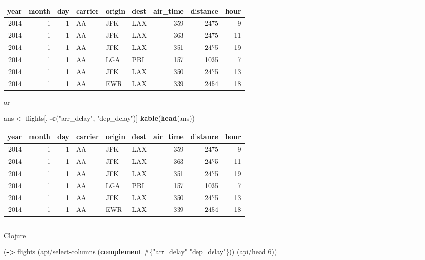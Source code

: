 \documentclass[]{article}
\newenvironment{Shaded}{\begin{snugshade}}{\end{snugshade}}
\newcommand{\DecValTok}[1]{\textcolor[rgb]{0.00,0.00,0.81}{#1}}
\newcommand{\KeywordTok}[1]{\textcolor[rgb]{0.13,0.29,0.53}{\textbf{#1}}}
\newcommand{\NormalTok}[1]{#1}
\newcommand{\OperatorTok}[1]{\textcolor[rgb]{0.81,0.36,0.00}{\textbf{#1}}}
\newcommand{\StringTok}[1]{\textcolor[rgb]{0.31,0.60,0.02}{#1}}
\begin{document}
\begin{longtable}[]{@{}rrrlllrrr@{}}
\toprule
year & month & day & carrier & origin & dest & air\_time & distance &
hour\tabularnewline
\midrule
\endhead
2014 & 1 & 1 & AA & JFK & LAX & 359 & 2475 & 9\tabularnewline
2014 & 1 & 1 & AA & JFK & LAX & 363 & 2475 & 11\tabularnewline
2014 & 1 & 1 & AA & JFK & LAX & 351 & 2475 & 19\tabularnewline
2014 & 1 & 1 & AA & LGA & PBI & 157 & 1035 & 7\tabularnewline
2014 & 1 & 1 & AA & JFK & LAX & 350 & 2475 & 13\tabularnewline
2014 & 1 & 1 & AA & EWR & LAX & 339 & 2454 & 18\tabularnewline
\bottomrule
\end{longtable}

or

\begin{Shaded}
\begin{Highlighting}[]
\NormalTok{ans <-}\StringTok{ }\NormalTok{flights[, }\OperatorTok{-}\KeywordTok{c}\NormalTok{(}\StringTok{"arr_delay"}\NormalTok{, }\StringTok{"dep_delay"}\NormalTok{)]}
\KeywordTok{kable}\NormalTok{(}\KeywordTok{head}\NormalTok{(ans))}
\end{Highlighting}
\end{Shaded}

\begin{longtable}[]{@{}rrrlllrrr@{}}
\toprule
year & month & day & carrier & origin & dest & air\_time & distance &
hour\tabularnewline
\midrule
\endhead
2014 & 1 & 1 & AA & JFK & LAX & 359 & 2475 & 9\tabularnewline
2014 & 1 & 1 & AA & JFK & LAX & 363 & 2475 & 11\tabularnewline
2014 & 1 & 1 & AA & JFK & LAX & 351 & 2475 & 19\tabularnewline
2014 & 1 & 1 & AA & LGA & PBI & 157 & 1035 & 7\tabularnewline
2014 & 1 & 1 & AA & JFK & LAX & 350 & 2475 & 13\tabularnewline
2014 & 1 & 1 & AA & EWR & LAX & 339 & 2454 & 18\tabularnewline
\bottomrule
\end{longtable}

\begin{center}\rule{0.5\linewidth}{0.5pt}\end{center}

Clojure

\begin{Shaded}
\begin{Highlighting}[]
\NormalTok{(}\KeywordTok{->}\NormalTok{ flights}
\NormalTok{    (api/select-columns (}\KeywordTok{complement}\NormalTok{ #\{}\StringTok{"arr_delay"} \StringTok{"dep_delay"}\NormalTok{\}))}
\NormalTok{    (api/head }\DecValTok{6}\NormalTok{))}
\end{Highlighting}
\end{Shaded}
\end{document}
